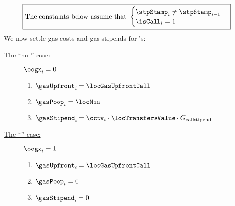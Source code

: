\[
	\boxed{\text{The constaints below assume that }
	\begin{cases}
		\stpStamp_{i} \neq \stpStamp_{i - 1} \\
		\isCall  _{i} =    1                     \\
	\end{cases}}
\]
We now settle gas costs and gas stipends for 's:
\begin{description}
	\item[\underline{The ``no \oogxSH{}'' case:}] \If $\oogx_{i} = 0$ \Then
		\begin{enumerate}
			\item $\gasUpfront_{i} = \locGasUpfrontCall$
			\item $\gasPoop_{i}    = \locMin$
			\item $\gasStipend_{i} = \cctv_{i} \cdot \locTransfersValue \cdot G_{\text{callstipend}}$
		\end{enumerate}
	\item[\underline{The ``\oogxSH{}'' case:}] \If $\oogx_{i} = 1$ \Then
		\begin{enumerate}
			\item $\gasUpfront_{i} = \locGasUpfrontCall$
			\item $\gasPoop_{i}    = 0$
			\item $\gasStipend_{i} = 0$
		\end{enumerate}
\end{description}
